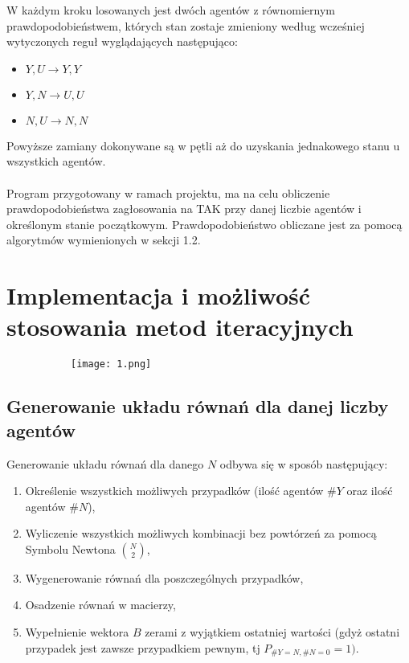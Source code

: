 \documentclass[10pt]{article}
\begin{document}
W każdym kroku losowanych jest dwóch agentów z równomiernym prawdopodobieństwem, których stan zostaje zmieniony według wcześniej wytyczonych reguł wyglądających następująco:
\begin{itemize}
	\item $ Y,U \to Y,Y $
	\item $ Y,N \to U,U $
	\item $ N,U \to N,N $
\end{itemize}
Powyższe zamiany dokonywane są w pętli aż do uzyskania jednakowego stanu u wszystkich agentów.\\
\\
Program przygotowany w ramach projektu, ma na celu obliczenie prawdopodobieństwa zagłosowania na TAK przy danej liczbie agentów i określonym stanie początkowym. Prawdopodobieństwo obliczane jest za pomocą algorytmów wymienionych w sekcji 1.2.

\section{Implementacja i możliwość stosowania metod iteracyjnych}
\begin{figure}[h]
	\caption{Wykres reprezentujący błąd bezwzględny metod Gaussa oraz metod iteracyjnych względem metody Monte Carlo\label{rys}}
	\centering
	\begin{subfigure}{0.5\textwidth}
		\texttt{[image: 1.png]}
		\caption{ \label{Rys1a}}
	\end{subfigure}
\end{figure}
\subsection{Generowanie układu równań dla danej liczby agentów}
Generowanie układu równań dla danego $N$ odbywa się w sposób następujący:
\begin{enumerate}
	\item Określenie wszystkich możliwych przypadków (ilość agentów $\#Y$ oraz ilość agentów $\#N$),
	\item Wyliczenie wszystkich możliwych kombinacji bez powtórzeń za pomocą Symbolu Newtona ${{N} \choose {2}}$,
	\item Wygenerowanie równań dla poszczególnych przypadków,
	\item Osadzenie równań w macierzy,
	\item Wypełnienie wektora $B$ zerami z wyjątkiem ostatniej wartości (gdyż ostatni przypadek jest zawsze przypadkiem pewnym, tj $P_{\#Y=N,\#N=0}=1)$.
\end{enumerate}
\end{document}
